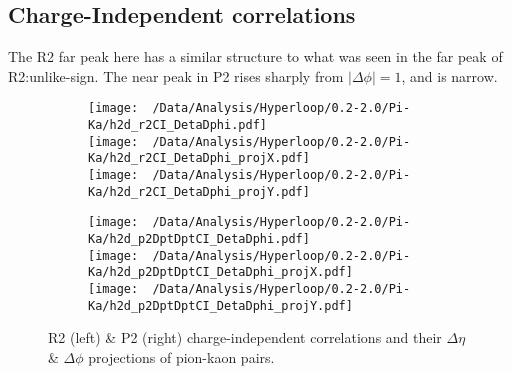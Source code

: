 \documentclass[12pt,a4paper,twoside]{report}
\begin{document}
\subsection{Charge-Independent correlations}
The R2 far peak here has a similar structure to what was seen in the far peak of R2:unlike-sign. The near peak in P2 rises sharply from $|\Delta\phi|=1$, and is narrow.
\begin{figure}[H]
	\begin{subfigure}{0.49\linewidth}
		\texttt{[image: ~/Data/Analysis/Hyperloop/0.2-2.0/Pi-Ka/h2d\_r2CI\_DetaDphi.pdf]}\\
		\texttt{[image: ~/Data/Analysis/Hyperloop/0.2-2.0/Pi-Ka/h2d\_r2CI\_DetaDphi\_projX.pdf]}\\
		\texttt{[image: ~/Data/Analysis/Hyperloop/0.2-2.0/Pi-Ka/h2d\_r2CI\_DetaDphi\_projY.pdf]}\\
	\end{subfigure}
	\begin{subfigure}{0.49\linewidth}
		\texttt{[image: ~/Data/Analysis/Hyperloop/0.2-2.0/Pi-Ka/h2d\_p2DptDptCI\_DetaDphi.pdf]}\\
		\texttt{[image: ~/Data/Analysis/Hyperloop/0.2-2.0/Pi-Ka/h2d\_p2DptDptCI\_DetaDphi\_projX.pdf]}\\
		\texttt{[image: ~/Data/Analysis/Hyperloop/0.2-2.0/Pi-Ka/h2d\_p2DptDptCI\_DetaDphi\_projY.pdf]}\\
	\end{subfigure}
	\caption{R2 (left) \& P2 (right) charge-independent correlations and their $\Delta\eta$ \& $\Delta\phi$ projections of pion-kaon pairs.}
\end{figure}
\end{document}
